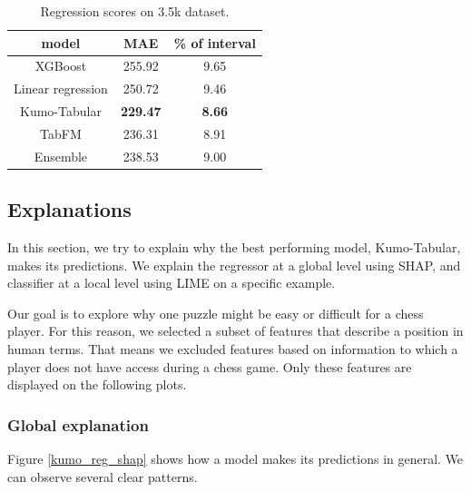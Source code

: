 \documentclass[sigconf,nonacm]{acmart}
\begin{document}

\begin{center}
\begin{table}[!ht]
\caption{Regression scores on 3.5k dataset.
\label{regression}}
\centering
{\begin{tabular}{c|c|c}
model & MAE & \% of interval  \\ \hline
XGBoost \cite{xgboost} & 255.92 & 9.65 \\
Linear regression \cite{scikit} & 250.72 & 9.46  \\
Kumo-Tabular \cite{kumo} & \textbf{229.47} & \textbf{8.66} \\
TabFM \cite{tabfm} & 236.31 & 8.91 \\
Ensemble & 238.53 & 9.00 \\
\end{tabular}}
\end{table}
\end{center}

\subsection{Explanations}

In this section, we try to explain why the best performing model, Kumo-Tabular,
makes its predictions. We explain the regressor at a global level 
using SHAP, and classifier at a local level using LIME on a specific example.

Our goal is to explore why one puzzle might be easy or difficult for 
a chess player. For this reason, we selected a subset of features that 
describe a position in human terms. That means we excluded features based on 
information to which 
a player does not have access during a chess game. Only these features 
are displayed on the following plots. 

\subsubsection{Global explanation}


Figure \ref{kumo_reg_shap} shows how a model makes its predictions 
in general. We can observe several clear patterns.
\end{document}
